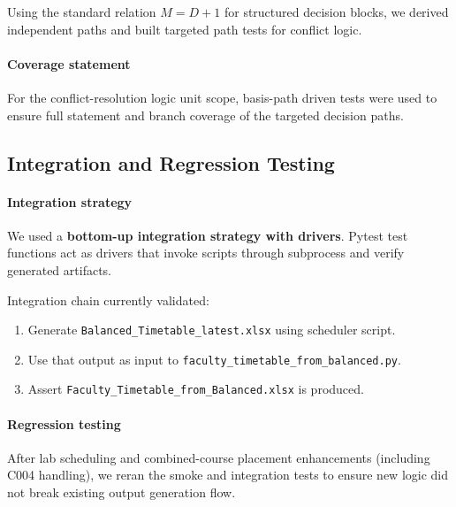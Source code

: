 \documentclass[12pt,a4paper]{article}
\begin{document}
Using the standard relation $M = D + 1$ for structured decision blocks, we derived independent paths and built targeted path tests for conflict logic.

\paragraph{Coverage statement}
For the conflict-resolution logic unit scope, basis-path driven tests were used to ensure full statement and branch coverage of the targeted decision paths.

\subsection{Integration and Regression Testing}

\paragraph{Integration strategy}
We used a \textbf{bottom-up integration strategy with drivers}. Pytest test functions act as drivers that invoke scripts through subprocess and verify generated artifacts.

Integration chain currently validated:
\begin{enumerate}[leftmargin=1.2cm]
  \item Generate \texttt{Balanced\_Timetable\_latest.xlsx} using scheduler script.
  \item Use that output as input to \texttt{faculty\_timetable\_from\_balanced.py}.
  \item Assert \texttt{Faculty\_Timetable\_from\_Balanced.xlsx} is produced.
\end{enumerate}

\paragraph{Regression testing}
After lab scheduling and combined-course placement enhancements (including C004 handling), we reran the smoke and integration tests to ensure new logic did not break existing output generation flow.
\end{document}
